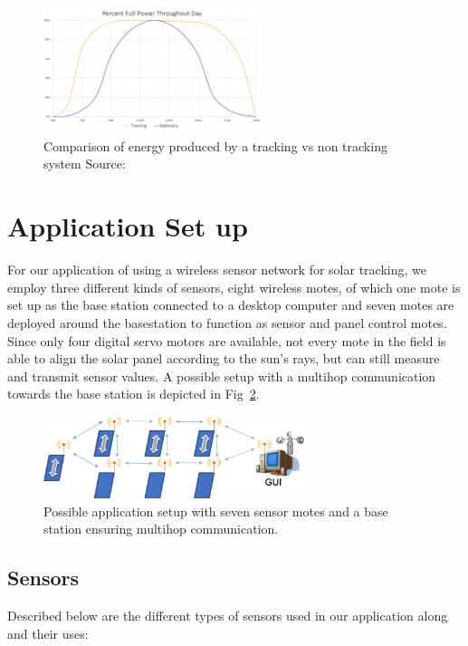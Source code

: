\documentclass[conference]{IEEEtran}
\begin{document}
\begin{figure}[htbp]
    \includegraphics[width=2.5in]{img/ComparisonTrackingVsNoTracking.png}
    \centering
    \captionsetup{justification=centering}
    \caption{Comparison of energy produced by a tracking vs non tracking system Source: \cite{b3}}
    \label{fig:ComparisonTvsNT}
\end{figure}

% 


\section{Application Set up}

For our application of using a wireless sensor network for solar tracking, we employ three different kinds of sensors, eight wireless motes, of which one mote is set up as the base station connected to a desktop computer and seven motes are deployed around the basestation to function as sensor and panel control motes.\\
Since only four digital servo motors are available, not every mote in the field is able to align the solar panel according to the sun's rays, but can still measure and transmit sensor values. A possible setup with a multihop communication towards the base station is depicted in Fig~\ref{fig:ApplicationSetup}. 


\begin{figure}[htbp]
    \includegraphics[width=3in]{img/Application_Setup.png}
    \centering
    \captionsetup{justification=centering}
    \caption{Possible application setup with seven sensor motes and a base station ensuring multihop communication.}
    \label{fig:ApplicationSetup}
\end{figure}

\subsection{Sensors}
Described below are the different types of sensors used in our application along and their uses:
\end{document}
